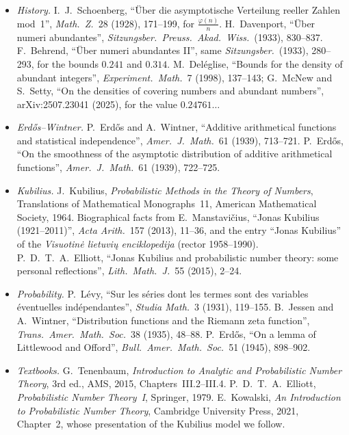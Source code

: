 \begin{itemize}
\item \emph{History.} I.~J.~Schoenberg, ``Über die asymptotische Verteilung reeller Zahlen mod~1'', \emph{Math.\ Z.}\ 28 (1928), 171--199, for $\frac{\varphi(n)}n$. H.~Davenport, ``Über numeri abundantes'', \emph{Sitzungsber.\ Preuss.\ Akad.\ Wiss.}\ (1933), 830--837. F.~Behrend, ``Über numeri abundantes II'', same \emph{Sitzungsber.}\ (1933), 280--293, for the bounds $0.241$ and $0.314$. M.~Deléglise, ``Bounds for the density of abundant integers'', \emph{Experiment.\ Math.}\ 7 (1998), 137--143; G.~McNew and S.~Setty, ``On the densities of covering numbers and abundant numbers'', arXiv:2507.23041 (2025), for the value $0.24761\ldots$
\item \emph{Erd\H{o}s--Wintner.} P.~Erd\H{o}s and A.~Wintner, ``Additive arithmetical functions and statistical independence'', \emph{Amer.\ J.\ Math.}\ 61 (1939), 713--721. P.~Erd\H{o}s, ``On the smoothness of the asymptotic distribution of additive arithmetical functions'', \emph{Amer.\ J.\ Math.}\ 61 (1939), 722--725.
\item \emph{Kubilius.} J.~Kubilius, \emph{Probabilistic Methods in the Theory of Numbers}, Translations of Mathematical Monographs~11, American Mathematical Society, 1964. Biographical facts from E.~Manstavičius, ``Jonas Kubilius (1921--2011)'', \emph{Acta Arith.}\ 157 (2013), 11--36, and the entry ``Jonas Kubilius'' of the \emph{Visuotinė lietuvių enciklopedija} (rector 1958--1990). P.~D.~T.~A.~Elliott, ``Jonas Kubilius and probabilistic number theory: some personal reflections'', \emph{Lith.\ Math.\ J.}\ 55 (2015), 2--24.
\item \emph{Probability.} P.~L\'evy, ``Sur les séries dont les termes sont des variables éventuelles indépendantes'', \emph{Studia Math.}\ 3 (1931), 119--155. B.~Jessen and A.~Wintner, ``Distribution functions and the Riemann zeta function'', \emph{Trans.\ Amer.\ Math.\ Soc.}\ 38 (1935), 48--88. P.~Erd\H{o}s, ``On a lemma of Littlewood and Offord'', \emph{Bull.\ Amer.\ Math.\ Soc.}\ 51 (1945), 898--902.
\item \emph{Textbooks.} G.~Tenenbaum, \emph{Introduction to Analytic and Probabilistic Number Theory}, 3rd ed., AMS, 2015, Chapters~III.2--III.4. P.~D.~T.~A.~Elliott, \emph{Probabilistic Number Theory~I}, Springer, 1979. E.~Kowalski, \emph{An Introduction to Probabilistic Number Theory}, Cambridge University Press, 2021, Chapter~2, whose presentation of the Kubilius model we follow.

\end{itemize}
